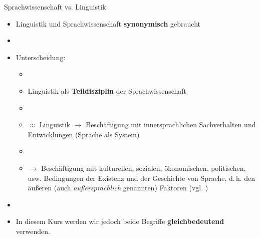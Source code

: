 \begin{frame}{Sprachwissenschaft vs. Linguistik}

	\begin{itemize}
		\item<1-> Linguistik und Sprachwissenschaft \idR \textbf{synonymisch} gebraucht
		\item[]
		\item<2-> Unterscheidung:
		
		\begin{itemize}
			\item[]
			\item<2-> Linguistik als \textbf{Teildisziplin} der Sprachwissenschaft
			\item[]
			\item<3->  $\approx$ Linguistik $\rightarrow$ Beschäftigung mit innersprachlichen Sachverhalten und Entwicklungen (Sprache als System)
			\item[]
			\item<4->  $\rightarrow$ Beschäftigung mit kulturellen, sozialen, ökonomischen, politischen, usw. Bedingungen der Existenz und der Geschichte von Sprache, d.\,h. den äußeren (auch \textit{außersprachlich} genannten) Faktoren (vgl. \citet{Glueck05a})
		\end{itemize}
		
		\item[]
		\item<5-> In diesem Kurs werden wir jedoch beide Begriffe \textbf{gleichbedeutend} verwenden.
	\end{itemize}
	
\end{frame}



